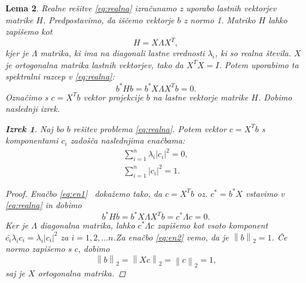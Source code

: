 \documentclass[12pt,a4paper]{amsart}\usepackage[slovene]{babel}%
\theoremstyle{definition}\newtheorem{definicija}{Definicija}[section]\newtheorem{primer}[definicija]{Primer}\newtheorem{opomba}[definicija]{Opomba}
\theoremstyle{plain}\newtheorem{lema}[definicija]{Lema}\newtheorem{izrek}[definicija]{Izrek}\newtheorem{trditev}[definicija]{Trditev}\newtheorem{posledica}[definicija]{Posledica}
\newcommand{\abs}[1]{ \left\lvert#1\right\rvert} \newcommand{\norm}[1]{\left\lVert#1\right\rVert}%
\begin{document}
{\begin{lema}
Realne rešitve \eqref{eq:realna} izračunamo z uporabo lastnih vektorjev matrike $H$. Predpostavimo, da iščemo vektorje $b$ z normo 1. Matriko $H$ lahko zapišemo kot $$H=X\Lambda X^T,$$ kjer je $\Lambda$ matrika, ki ima na diagonali lastne vrednosti $\lambda_i$, ki so realna števila. $X$ je ortogonalna matrika lastnih vektorjev, tako da $X^T X=I$. Potem uporabimo ta spektralni razcep v \eqref{eq:realna}: $$b^\ast Hb=b^\ast X\Lambda X^T b=0.$$ Označimo s $c=X^Tb$ vektor projekcije $b$ na lastne vektorje matrike $H$. Dobimo naslednji izrek.\begin{izrek} \label{izrek2}\cite{meurant}Naj bo $b$ rešitev problema \eqref{eq:realna}. Potem vektor $c=X^T b$ s komponentami $c_i$ zadošča naslednjima enačbama:\begin{align}\sum_{i=1}^{n} \lambda_i \abs{c_i}^2=0 \label{eq:en1},\\\sum_{i=1}^{n}\abs{c_i}^2=1. \label{eq:en2}\end{align}\end{izrek}\begin{proof}Enačbo \eqref{eq:en1}  dokažemo tako, da $c=X^Tb$ oz. $c^\ast =b^\ast X$ vstavimo v \eqref{eq:realna} in dobimo $$b^\ast Hb=b^\ast X\Lambda X^T b= c^\ast \Lambda c=0.$$ Ker je $\Lambda$ diagonalna matrika, lahko $c^\ast \Lambda c$ zapišemo kot vsoto komponent $\bar{c_i}\lambda_i c_i=\lambda_i\abs{c_i}^2$ za $i=1,2,...n$.Za enačbo \eqref{eq:en2} vemo, da je $\norm{b}_2=1$. Če normo zapišemo s $c$, dobimo $$\norm{b}_2=\norm{Xc}_2=\norm{c}_2=1,$$ saj je $X$ ortogonalna matrika.
\end{proof}%

\end{lema}}
\end{document}
